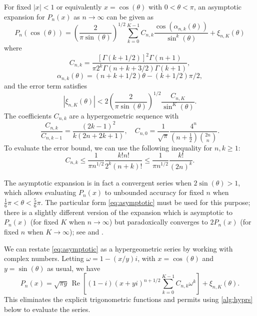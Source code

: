 \documentclass[nohypdvips,review]{siamart0216}
\begin{document}
For fixed $|x| < 1$ or equivalently $x = \cos(\theta)$ with $0 < \theta < \pi$,
an asymptotic expansion for $P_n(x)$ as $n \to \infty$
can be given as \cite[Eq.~3.4]{Bogaert2012}
\begin{equation}
\label{eq:asymptotic}
P_n(\cos(\theta)) = \left(\frac{2}{\pi \sin(\theta)}\right)^{1/2}
\sum_{k=0}^{K-1} C_{n,k} \frac{\cos(\alpha_{n,k}(\theta))}{\sin^k(\theta)}
+ \xi_{n,K}(\theta)
\end{equation}
where
\begin{equation}
C_{n,k} = \frac{[\Gamma(k+1/2)]^2 \Gamma(n+1)}{\pi 2^k \Gamma(n+k+3/2) \Gamma(k+1)},
\end{equation}
\begin{equation}
\alpha_{n,k}(\theta) = (n+k+1/2) \theta - (k+1/2) \pi / 2,
\end{equation}
and the error term satisfies
\begin{equation}
\label{eq:truncerr0}
|\xi_{n,K}(\theta)| < 2 \left(\frac{2}{\pi \sin(\theta)}\right)^{1/2} \frac{C_{n,K}}{\sin^K(\theta)}.
\end{equation}
The coefficients $C_{n,k}$ are a hypergeometric sequence with
\begin{equation}
\label{eq:asymprec}
\frac{C_{n,k}}{C_{n,k-1}} = \frac{(2k-1)^2}{k (2n+2k+1)}, \quad C_{n,0} = \frac{1}{\sqrt{\pi}} \frac{4^n}{(n+\tfrac{1}{2}) {2n \choose n}}.
\end{equation}
To evaluate the error bound, we can use the following inequality for $n, k \ge 1$:
\begin{equation}
\label{eq:truncerr0b}
C_{n,k} \le \frac{1}{\pi n^{1/2}} \frac{k! n!}{2^k (n+k)!} \le \frac{1}{\pi n^{1/2}} \frac{k!}{(2n)^k}.
\end{equation}

The asymptotic expansion is in fact a convergent series
when $2 \sin(\theta) > 1$, which allows evaluating $P_n(x)$ to unbounded
accuracy for fixed $n$ when $\tfrac{1}{6}\pi < \theta < \tfrac{5}{6} \pi$.
The particular form \cref{eq:asymptotic}
must be used for this purpose; there is a slightly different version of the expansion
which is asymptotic to $P_n(x)$ (for fixed $K$ when $n \to \infty$)
but paradoxically
converges to $2 P_n(x)$ (for fixed $n$ when $K \to \infty$); see \cite{Olver1997} and \cite{Olver2010}.

We can restate \cref{eq:asymptotic} as a hypergeometric series
by working with complex numbers.
Letting $\omega = 1 - (x/y) i$, with $x = \cos(\theta)$ and $y =
\sin(\theta)$ as usual, we have
\begin{equation}
\label{eq:asymptoticcomplex}
P_n(x) = \sqrt{\pi y} \, \operatorname{Re}\left[
(1-i) (x+y i)^{n+1/2}
\sum_{k=0}^{K-1} C_{n,k} \omega^k\right] + \xi_{n,K}(\theta).
\end{equation}
This eliminates the explicit trigonometric functions and permits using
\cref{alg:hyprs} below to evaluate the series.
\end{document}
